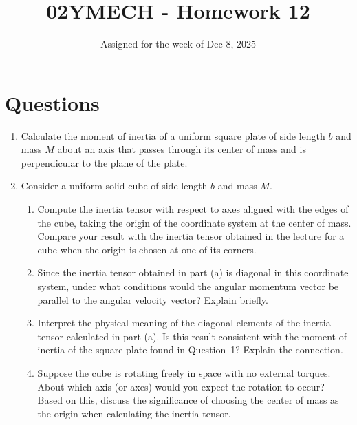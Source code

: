 \documentclass[12pt]{article}
\title{02YMECH - Homework 12}
\date{Assigned for the week of Dec 8, 2025}
\author{}
\begin{document}
\maketitle

\section*{Questions}
\begin{enumerate}
    \item Calculate the moment of inertia of a uniform square plate of side length $b$ and mass $M$ about an axis that passes through its center of mass and is perpendicular to the plane of the plate.

    \item Consider a uniform solid cube of side length $b$ and mass $M$.
    \begin{enumerate}
        \item Compute the inertia tensor with respect to axes aligned with the edges of the cube, taking the origin of the coordinate system at the center of mass. Compare your result with the inertia tensor obtained in the lecture for a cube when the origin is chosen at one of its corners.
        \item Since the inertia tensor obtained in part (a) is diagonal in this coordinate system, under what conditions would the angular momentum vector be parallel to the angular velocity vector? Explain briefly.
        \item Interpret the physical meaning of the diagonal elements of the inertia tensor calculated in part (a). Is this result consistent with the moment of inertia of the square plate found in Question~1? Explain the connection.
        \item Suppose the cube is rotating freely in space with no external torques. About which axis (or axes) would you expect the rotation to occur? Based on this, discuss the significance of choosing the center of mass as the origin when calculating the inertia tensor.
    \end{enumerate}
\end{enumerate}
\end{document}
